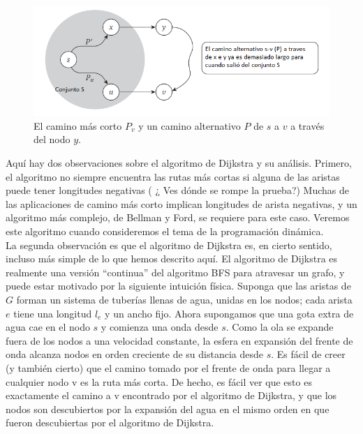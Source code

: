 \documentclass[a4paper, 12pt]{book}
\theoremstyle{dotless}
\begin{document}
\begin{figure}[h]
\centering
\includegraphics[width=\textwidth]{Imagenes-Seccion4/fig_4_8.PNG}
\caption{ El camino más corto $P_v$ y un camino alternativo $P$ de $s$ a $v$ a través del nodo $y$.}
\label{fig:fig4.8}
\end{figure}



Aquí hay dos observaciones sobre el algoritmo de Dijkstra y su análisis. Primero, el algoritmo no siempre encuentra las rutas más cortas si alguna de las aristas puede tener longitudes negativas ( ¿ Ves dónde se rompe la prueba?) Muchas de las aplicaciones de camino más corto implican longitudes de arista negativas, y un algoritmo más complejo, de Bellman y Ford, se requiere para este caso. Veremos este algoritmo cuando consideremos el tema de la programación dinámica.\\


La segunda observación es que el algoritmo de Dijkstra es, en cierto sentido, incluso
más simple de lo que hemos descrito aquí. El algoritmo de Dijkstra es realmente una
versión ``continua'' del algoritmo BFS para atravesar un
grafo, y puede estar motivado por la siguiente intuición física. Suponga que
las aristas de $G$ forman un sistema de tuberías llenas de agua, unidas en
los nodos; cada arista $e$ tiene una longitud $l_e$ y un ancho fijo. Ahora
supongamos que una gota extra de agua cae en el nodo $s$ y comienza una onda desde $s$. Como
la ola se expande fuera de los nodos a una velocidad constante, la esfera en expansión
del frente de onda alcanza nodos en orden creciente de su distancia desde $s$. Es
fácil de creer (y también cierto) que el camino tomado por el frente de onda para llegar a
cualquier nodo v es la ruta más corta. De hecho, es fácil ver que esto es exactamente el
camino a v encontrado por el algoritmo de Dijkstra, y que los nodos son descubiertos por
la expansión del agua en el mismo orden en que fueron descubiertas por el algoritmo de Dijkstra.\\
\end{document}
